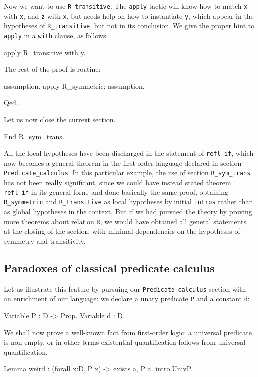 \documentclass[11pt,a4paper]{book}
\begin{document}
Now we want to use \verb:R_transitive:. The \verb:apply: tactic will know
how to match \verb:x: with \verb:x:, and \verb:z: with \verb:x:, but needs
help on how to instantiate \verb:y:, which appear in the hypotheses of
\verb:R_transitive:, but not in its conclusion. We give the proper hint
to \verb:apply: in a \verb:with: clause, as follows:
\begin{coq_example}
apply R_transitive with y.
\end{coq_example}

The rest of the proof is routine:
\begin{coq_example}
assumption.
apply R_symmetric; assumption.
\end{coq_example}
\begin{coq_example*}
Qed.
\end{coq_example*}

Let us now close the current section.
\begin{coq_example}
End R_sym_trans.
\end{coq_example}

All the local hypotheses have been
discharged in the statement of \verb:refl_if:, which now becomes a general
theorem in the first-order language declared in section 
\verb:Predicate_calculus:. In this particular example, the use of section
\verb:R_sym_trans: has not been really significant, since we could have
instead stated theorem \verb:refl_if: in its general form, and done 
basically the same proof, obtaining \verb:R_symmetric: and
\verb:R_transitive: as local hypotheses by initial \verb:intros: rather
than as global hypotheses in the context. But if we had pursued the
theory by proving more theorems about relation \verb:R:,
we would have obtained all general statements at the closing of the section,
with minimal dependencies on the hypotheses of symmetry and transitivity.

\subsection{Paradoxes of classical predicate calculus}

Let us illustrate this feature by pursuing our \verb:Predicate_calculus:
section with an enrichment of our language: we declare a unary predicate
\verb:P: and a constant \verb:d::
\begin{coq_example}
Variable P :  D -> Prop.
Variable d : D.
\end{coq_example}

We shall now prove a well-known fact from first-order logic: a universal 
predicate is non-empty, or in other terms existential quantification 
follows from universal quantification.
\begin{coq_example}
Lemma weird : (forall x:D, P x) ->  exists a, P a.
 intro UnivP.
\end{coq_example}
\end{document}
